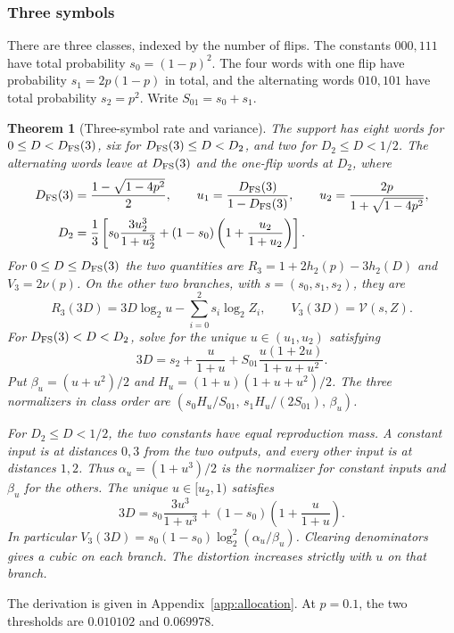 \documentclass[11pt,letterpaper]{article}
\newtheorem{theorem}{Theorem}
\theoremstyle{definition}
\newcommand{\Vfun}{\mathcal V}
\newcommand{\hx}{h_2}
\begin{document}
\subsubsection{Three symbols}\label{sec:three}
There are three classes, indexed by the number of flips. The constants $000,111$ have total probability $s_0=(1-p)^2$. The four words with one flip have probability $s_1=2p(1-p)$ in total, and the alternating words $010,101$ have total probability $s_2=p^2$. Write $S_{01}=s_0+s_1$.
\begin{theorem}[Three-symbol rate and variance]\label{thm:three}
The support has eight words for $0\le D<D_{\rm FS}(3)$, six for $D_{\rm FS}(3)\le D<D_2$, and two for $D_2\le D<1/2$. The alternating words leave at $D_{\rm FS}(3)$ and the one-flip words at $D_2$, where
\begin{align}
 D_{\rm FS}(3)&=\frac{1-\sqrt{1-4p^2}}2,\qquad u_1=\frac{D_{\rm FS}(3)}{1-D_{\rm FS}(3)},\qquad
 u_2=\frac{2p}{1+\sqrt{1-4p^2}},                               \label{eq:d3a}\\
 D_2&=\frac13\left[s_0\frac{3u_2^3}{1+u_2^3}
              +(1-s_0)\left(1+\frac{u_2}{1+u_2}\right)\right].  \label{eq:d3b}
\end{align}
\normalfont
For $0\le D\le D_{\rm FS}(3)$ the two quantities are $R_3=1+2\hx(p)-3\hx(D)$ and $V_3=2\nu(p)$. On the other two branches, with $s=(s_0,s_1,s_2)$, they are
\[
 R_3(3D)=3D\log_2u-\sum_{i=0}^2s_i\log_2Z_i,\qquad V_3(3D)=\Vfun(s,Z).
\]
For $D_{\rm FS}(3)<D<D_2$, solve for the unique $u\in(u_1,u_2)$ satisfying
\begin{equation}
 3D=s_2+\frac{u}{1+u}+S_{01}\frac{u(1+2u)}{1+u+u^2}.          \label{eq:3mid}
\end{equation}
Put $\beta_u=(u+u^2)/2$ and $H_u=(1+u)(1+u+u^2)/2$. The three normalizers in class order are $(s_0 H_u/S_{01},\,s_1 H_u/(2S_{01}),\,\beta_u)$.

For $D_2\le D<1/2$, the two constants have equal reproduction mass. A constant input is at distances $0,3$ from the two outputs, and every other input is at distances $1,2$. Thus $\alpha_u=(1+u^3)/2$ is the normalizer for constant inputs and $\beta_u$ for the others. The unique $u\in[u_2,1)$ satisfies
\[
 3D=s_0\frac{3u^3}{1+u^3}+(1-s_0)\left(1+\frac{u}{1+u}\right).
\]
In particular $V_3(3D)=s_0(1-s_0)\log_2^2(\alpha_u/\beta_u)$. Clearing denominators gives a cubic on each branch. The distortion increases strictly with $u$ on that branch. \end{theorem}
The derivation is given in Appendix~\ref{app:allocation}. At $p=0.1$, the two thresholds are $0.010102$ and $0.069978$.
\end{document}

